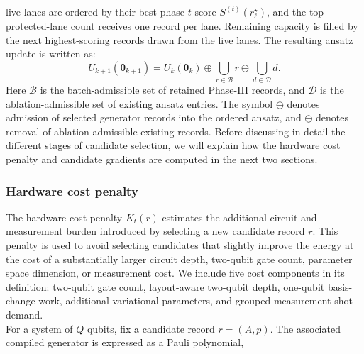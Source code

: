 \documentclass[
  reprint,
  amsmath,
  amssymb,
  aps,
  pra,
  nofootinbib,
  superscriptaddress,
  floatfix
]{revtex4-2}
\begin{document}
live lanes are ordered by their best phase-\(t\) score
\(S^{(t)}(r_{\ell}^{\star})\), and the top protected-lane count receives one
record per lane. Remaining capacity is filled by the next highest-scoring records
drawn from the live lanes.
The resulting ansatz update is written as:
%
\begin{equation*}
U_{k+1}(\boldsymbol\theta_{k+1})
=
U_k(\boldsymbol\theta_k)
\oplus
\bigcup_{r\in\mathcal B} r
\ominus
\bigcup_{d\in\mathcal D} d .
\end{equation*}
%
Here $\mathcal B$ is the batch-admissible set of retained Phase-III records, and $\mathcal D$ is the ablation-admissible set of existing ansatz entries. The symbol \(\oplus\) denotes admission of selected generator records into the ordered ansatz, and \(\ominus\) denotes removal of ablation-admissible existing records. Before discussing in detail the different stages of candidate selection, we will explain how the hardware cost penalty and candidate gradients are computed in the next two sections.

\subsubsection{Hardware cost penalty}
%
\noindent
The hardware-cost penalty \(K_t(r)\) estimates the additional circuit and measurement burden introduced by selecting a new candidate record \(r\). This penalty is used to avoid selecting candidates that slightly improve the energy at the cost of a substantially larger circuit depth, two-qubit gate count, parameter space dimension, or measurement cost. We include five cost components in its definition: two-qubit gate count, layout-aware two-qubit depth, one-qubit basis-change work, additional variational parameters, and grouped-measurement shot demand.\\
\noindent
For a system of \(Q\) qubits, fix a candidate record \(r=(A,p)\). The associated compiled generator is expressed as a Pauli polynomial,
\end{document}
